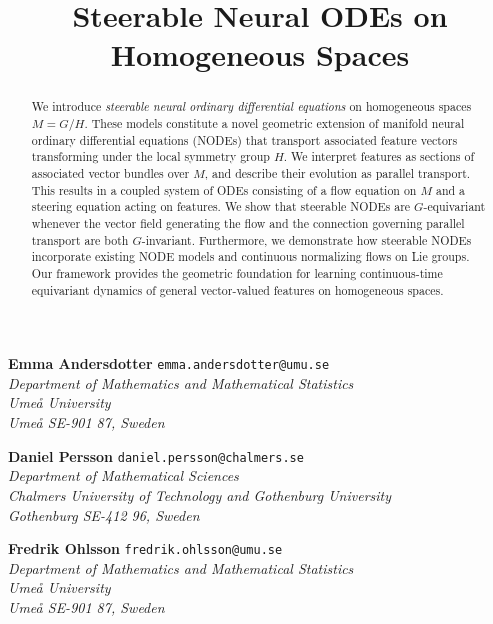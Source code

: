 \documentclass[12pt,a4paper]{article}
\title{Steerable Neural ODEs on Homogeneous Spaces
}
\date{}
\numberwithin{equation}{section}
\theoremstyle{plain}
\theoremstyle{definition}
\theoremstyle{remark}
\begin{document}
\maketitle

\vspace*{-10mm}
\begin{center}
\begin{minipage}[t]{0.8\textwidth}
\textbf{Emma Andersdotter} \hfill {\footnotesize \tt emma.andersdotter@umu.se}\\
\textit{\footnotesize Department of Mathematics and Mathematical Statistics\\
Ume{\aa} University\\ Ume{\aa} SE-901 87, Sweden}
\end{minipage}
\end{center}

\begin{center}
\begin{minipage}[t]{0.8\textwidth}
\textbf{Daniel Persson} \hfill {\footnotesize \tt daniel.persson@chalmers.se} \\
\textit{\footnotesize Department of Mathematical Sciences\\ Chalmers University of Technology and Gothenburg University\\Gothenburg SE-412 96, Sweden}
\end{minipage}
\end{center}

\begin{center}
\begin{minipage}[t]{0.8\textwidth}
\textbf{Fredrik Ohlsson}  \hfill {\footnotesize \tt fredrik.ohlsson@umu.se}\\
\textit{\footnotesize Department of Mathematics and Mathematical Statistics\\
Ume{\aa} University\\ Ume{\aa} SE-901 87, Sweden}
\end{minipage}
\end{center}
\vspace*{5mm}




\begin{abstract}
\noindent We introduce \textit{steerable neural ordinary differential equations} on homogeneous spaces $M=G/H$. These models constitute a novel geometric extension of manifold neural ordinary differential equations (NODEs) that transport associated feature vectors transforming under the local symmetry group $H$.
We interpret features as sections of associated vector bundles over $M$, and describe their evolution as parallel transport. This results in a coupled system of ODEs consisting of a flow equation on $M$ and a steering equation acting on features. 
We show that steerable NODEs are $G$-equivariant whenever the vector field generating the flow and the connection governing parallel transport are both $G$-invariant. Furthermore, we demonstrate how steerable NODEs incorporate existing NODE models and continuous normalizing flows on Lie groups. Our framework provides the geometric foundation for learning continuous-time equivariant dynamics of general vector-valued features on homogeneous spaces.
\end{abstract}
\end{document}
